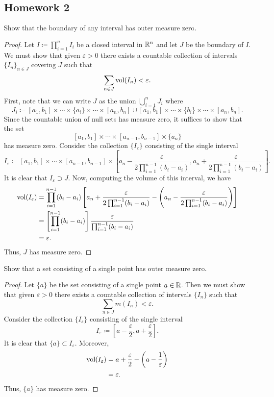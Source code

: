 \subsection{Homework 2}
\begin{problem}
  Show that the boundary of any interval has outer measure zero.
\end{problem}
\begin{proof}
  Let $I\coloneq\prod_{i=1}^n I_i$ be a closed interval in $\mathbb{R}^n$ and let
  $J$ be the boundary of $I$. We must show that given $\varepsilon>0$ there
  exists a countable collection of intervals $\{I_n\}_{n\in J}$ covering
  $J$ such that
  \[
    \sum_{n\in J}\operatorname{vol}(I_n)<\varepsilon.
  \]
  First, note that we can write $J$ as the union $\bigcup_{i=1}^n J_i$
  where
  \[
    J_i\coloneq%
      [a_1,b_1]\times\cdots\times\{a_i\}\times\cdots\times[a_n,b_n]%
    \cup
    [a_1,b_1]\times\cdots\times\{b_i\}\times\cdots\times[a_n,b_n].
  \]
  Since the countable union of null sets has measure zero, it suffices to
  show that the set
  \[
    [a_1,b_1]\times\cdots\times[a_{n-1},b_{n-1}]\times\{a_n\}%
  \]
  has measure zero. Consider the collection $\{I_\varepsilon\}$ consisting
  of the single interval
  \[
    I_\varepsilon\coloneq [a_1,b_1]\times\cdots\times[a_{n-1},b_{n-1}]
    \times\left[a_n-\frac{\varepsilon}{2\prod_{i=1}^{n-1}(b_i-a_i)},
      a_n+\frac{\varepsilon}{2\prod_{i=1}^{n-1}(b_i-a_i)}\right].
  \]
  It is clear that $I_\varepsilon\supset J$. Now, computing the volume of
  this interval, we have
  \begin{align*}
    \vol(I_\varepsilon)%
    &=\prod_{i=1}^{n-1}(b_i-a_i)%
    \left[%
    a_n+\frac{\varepsilon}{2\prod_{i=1}^{n-1}(b_i-a_i)}%
    -\left(%
    a_n -\frac{\varepsilon}{2\prod_{i=1}^{n-1}(b_i-a_i)} \right)
    \right]\\
    &=\left[\prod_{i=1}^{n-1}(b_i-a_i)\right]%
      \frac{\varepsilon}{\prod_{i=1}^{n-1}(b_i-a_i)}\\
    &=\varepsilon.
  \end{align*}
  Thus, $J$ has measure zero.
\end{proof}

\begin{problem}
  Show that a set consisting of a single point has outer measure zero.
\end{problem}
\begin{proof}
  Let $\{a\}$ be the set consisting of a single point $a\in\mathbb{R}$. Then we
  must show that given $\varepsilon>0$ there exists a countable collection
  of intervals $\{I_n\}$ such that
  \[
    \sum_{n\in J} m(I_n)<\varepsilon.
  \]
  Consider the collection $\{I_\varepsilon\}$ consisting of the single
  interval
  \[
    I_\varepsilon\coloneq
    \left[a-\frac{\varepsilon}{2},a+\frac{\varepsilon}{2}\right].
  \]
  It is clear that $\{a\}\subset I_\varepsilon$. Moreover,
  \begin{align*}
    \operatorname{vol}(I_\varepsilon)
    &=a+\frac{\varepsilon}{2}-\left(a-\frac{1}{\varepsilon}\right)\\
    &=\varepsilon.
  \end{align*}
  Thus, $\{a\}$ has measure zero.
\end{proof}

